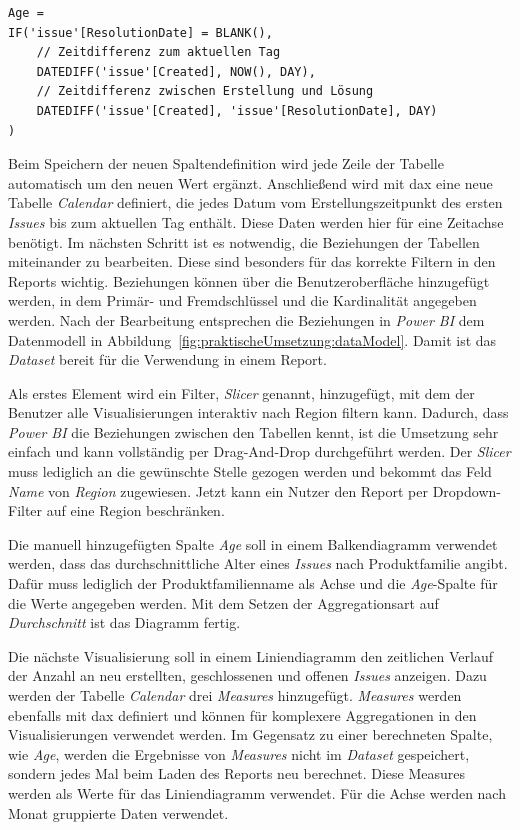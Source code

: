 \begin{minipage}{\linewidth}
\begin{lstlisting}[caption=Code zur Defintion der Spalte \textit{Age} von Tabelle \textit{Issue},captionpos=b,style=sharpc]
Age = 
IF('issue'[ResolutionDate] = BLANK(),
    // Zeitdifferenz zum aktuellen Tag
    DATEDIFF('issue'[Created], NOW(), DAY),
    // Zeitdifferenz zwischen Erstellung und Lösung
    DATEDIFF('issue'[Created], 'issue'[ResolutionDate], DAY)
)
\end{lstlisting}
\end{minipage}

\noindent Beim Speichern der neuen Spaltendefinition wird jede Zeile der Tabelle automatisch um den neuen Wert ergänzt. Anschließend wird mit \ac{dax} eine neue Tabelle \textit{Calendar} definiert, die jedes Datum vom Erstellungszeitpunkt des ersten \textit{Issues} bis zum aktuellen Tag enthält. Diese Daten werden hier für eine Zeitachse benötigt. Im nächsten Schritt ist es notwendig, die Beziehungen der Tabellen miteinander zu bearbeiten. Diese sind besonders für das korrekte Filtern in den Reports wichtig. Beziehungen können über die Benutzeroberfläche hinzugefügt werden, in dem Primär- und Fremdschlüssel und die Kardinalität angegeben werden. Nach der Bearbeitung entsprechen die Beziehungen in \textit{Power BI} dem Datenmodell in Abbildung~\ref{fig:praktischeUmsetzung:dataModel}. Damit ist das \textit{Dataset} bereit für die Verwendung in einem Report.

Als erstes Element wird ein Filter, \textit{Slicer} genannt, hinzugefügt, mit dem der Benutzer alle Visualisierungen interaktiv nach Region filtern kann. Dadurch, dass \textit{Power BI} die Beziehungen zwischen den Tabellen kennt, ist die Umsetzung sehr einfach und kann vollständig per Drag-And-Drop durchgeführt werden. Der \textit{Slicer} muss lediglich an die gewünschte Stelle gezogen werden und bekommt das Feld \textit{Name} von \textit{Region} zugewiesen. Jetzt kann ein Nutzer den Report per Dropdown-Filter auf eine Region beschränken.

Die manuell hinzugefügten Spalte \textit{Age} soll in einem Balkendiagramm verwendet werden, dass das durchschnittliche Alter eines \textit{Issues} nach Produktfamilie angibt. Dafür muss lediglich der Produktfamilienname als Achse und die \textit{Age}-Spalte für die Werte angegeben werden. Mit dem Setzen der Aggregationsart auf \textit{Durchschnitt} ist das Diagramm fertig.

Die nächste Visualisierung soll in einem Liniendiagramm den zeitlichen Verlauf der Anzahl an neu erstellten, geschlossenen und offenen \textit{Issues} anzeigen. Dazu werden der Tabelle \textit{Calendar} drei \textit{Measures} hinzugefügt. \textit{Measures} werden ebenfalls mit \ac{dax} definiert und können für komplexere Aggregationen in den Visualisierungen verwendet werden. Im Gegensatz zu einer berechneten Spalte, wie \textit{Age}, werden die Ergebnisse von \textit{Measures} nicht im \textit{Dataset} gespeichert, sondern jedes Mal beim Laden des Reports neu berechnet. Diese Measures werden als Werte für das Liniendiagramm verwendet. Für die Achse werden nach Monat gruppierte Daten verwendet.

